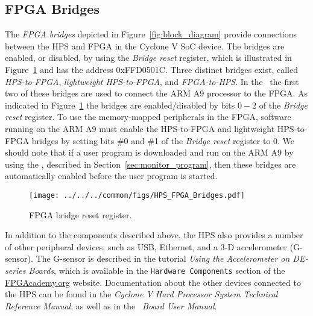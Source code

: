 \subsection{FPGA Bridges}
\label{sec:FPGA_bridge}
The {\it FPGA bridges} depicted in Figure~\ref{fig:block_diagram} provide connections between
the HPS and FPGA in the Cyclone V SoC device. The bridges are enabled, or disabled, 
by using the {\it Bridge reset} register, which is illustrated in 
Figure~\ref{fig:FPGA_bridge} and has the address {\sf 0xFFD0501C}.  
Three distinct bridges exist, called {\it HPS-to-FPGA}, {\it lightweight HPS-to-FPGA}, and 
{\it FPGA-to-HPS}.  In the \systemName~the first two of these bridges are used to
connect the ARM A9 processor to the FPGA.  As indicated in 
Figure~\ref{fig:FPGA_bridge} the bridges are enabled/disabled by bits $0-2$ of the 
{\it Bridge reset} register.  To use the memory-mapped peripherals in the FPGA, software 
running on the ARM A9 must enable the HPS-to-FPGA and lightweight HPS-to-FPGA bridges by
setting bits \#0 and \#1 of the {\it Bridge reset} register to 0. 
We should note that if a user program is downloaded and run on the ARM A9 by using the
\productNameMed{}, described in Section~\ref{sec:monitor_program},
then these bridges are automatically enabled before the user program is started.

\begin{figure}[h!]
   \begin{center}
       \texttt{[image: ../../../common/figs/HPS\_FPGA\_Bridges.pdf]}
   \end{center}
   \caption{FPGA bridge reset register.}
	\label{fig:FPGA_bridge}
\end{figure}

In addition to the components described above, the HPS also provides a number of other
peripheral devices, such as USB, Ethernet, and a 3-D accelerometer (G-sensor). The
G-sensor is described in the tutorial {\it Using the Accelerometer on DE-series Boards}, 
which is available in the \texttt{Hardware Components} section of the
\href{https://www.fpgacademy.org/tutorials.html} {FPGAcademy.org} website.
Documentation about the other devices 
connected to the HPS can be found in the {\it Cyclone V Hard Processor System
Technical Reference Manual}, as well as in the {\it \DEBoard~Board User Manual}.


